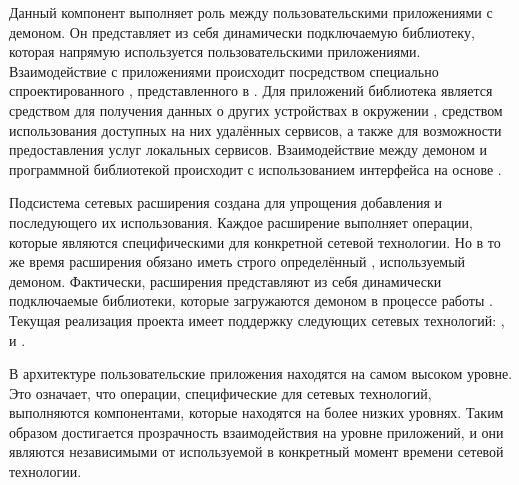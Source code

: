 

%
Данный компонент выполняет роль  между пользовательскими приложениями с демоном.
%
Он представляет из себя динамически подключаемую библиотеку, которая напрямую используется пользовательскими приложениями.
%
Взаимодействие с приложениями происходит посредством специально спроектированного , представленного в .
%
Для приложений библиотека является средством для получения данных о других устройствах в окружении , средством использования доступных на них удалённых сервисов, а также для возможности предоставления услуг локальных сервисов.
%
Взаимодействие между демоном и программной библиотекой происходит с использованием интерфейса на основе  .



%
Подсистема сетевых расширения создана для упрощения добавления  и последующего их использования.
%
Каждое расширение выполняет операции, которые являются специфическими для конкретной сетевой технологии.
%
Но в то же время расширения обязано иметь строго определённый , используемый демоном.
%
Фактически, расширения представляют из себя динамически подключаемые библиотеки, которые загружаются демоном в процессе работы .
%
Текущая реализация проекта имеет поддержку следующих сетевых технологий:  ,   и  .



%
В архитектуре  пользовательские приложения находятся на самом высоком уровне.
%
Это означает, что операции, специфические для сетевых технологий, выполняются компонентами, которые находятся на более низких уровнях.
%
Таким образом достигается прозрачность взаимодействия на уровне приложений, и они являются независимыми от используемой в конкретный момент времени сетевой технологии.

